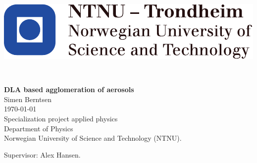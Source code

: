 
\thispagestyle{empty}
\begin{center}
\includegraphics[scale=1.1]{fig/NTNU_logo.pdf}
\end{center}
\mbox{}\\[6pc]
\begin{center}
\Huge{\textbf{DLA based agglomeration of aerosols}}\\[2pc]

\Large{
Simen Berntsen\\
}
\large{\today}\\[2pc]

Specialization project applied physics\\
Department of Physics \\
Norwegian University of Science and Technology (NTNU).
\end{center}
\vfill

\noindent Supervisor: Alex Hansen.
\newpage
